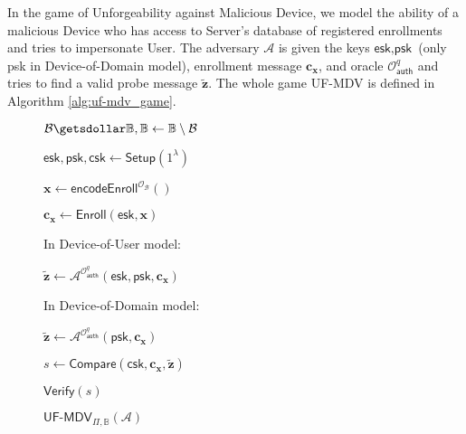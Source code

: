 In the game of Unforgeability against Malicious Device, we model the ability of a malicious \textsf{Device} who has access to \textsf{Server}'s database of registered enrollments and tries to impersonate \textsf{User}.
The adversary $\mathcal{A}$ is given the keys $\textsf{esk}, \textsf{psk}$ (only \textsf{psk} in Device-of-Domain model), enrollment message $\mathbf{c_x}$, and oracle $\mathcal{O}_\textsf{auth}^q$ and tries to find a valid probe message $\mathbf{\tilde{z}}$.
The whole game \textsf{UF-MDV} is defined in Algorithm \ref{alg:uf-mdv_game}. 
\begin{figure}[h]
\centering

	\begin{minipage}[t]{0.5\linewidth}
	\begin{algorithm}[H]
	\caption{$\textsf{UF-MDV}_{\Pi, \mathbb{B}}(\mathcal{A})$}
	\label{alg:uf-mdv_game}
	\begin{algorithmic}[1]
		\State $\mathcal{B} \getsdollar \mathbb{B}, \mathbb{B} \gets \mathbb{B} \setminus \mathcal{B}$

		\State $\textsf{esk}, \textsf{psk}, \textsf{csk} \gets \textsf{Setup}(1^\lambda)$

		\State $\mathbf{x} \gets \textsf{encodeEnroll}^{\mathcal{O}_{\mathcal{B}}}()$

		\State $\mathbf{c_x} \gets \textsf{Enroll}(\textsf{esk}, \mathbf{x})$

		\State In Device-of-User model:
		
		\State \hspace{\algorithmicindent} ${\mathbf{\tilde{z}}} \gets \mathcal{A}^{ \mathcal{O}_\textsf{auth}^q } (\textsf{esk}, \textsf{psk}, \mathbf{c_x} )$

		\State In Device-of-Domain model:
		
		\State \hspace{\algorithmicindent} ${\mathbf{\tilde{z}}} \gets \mathcal{A}^{ \mathcal{O}_\textsf{auth}^q } ( \textsf{psk}, \mathbf{c_x} )$

		\State $s \gets \textsf{Compare}( \textsf{csk}, \mathbf{c_x}, \mathbf{\tilde{z}} )$

		\State \Return $\textsf{Verify}(s)$
	\end{algorithmic}
	\end{algorithm}
	\end{minipage}
	
\label{fig:uf-mdv_game}
\end{figure}


